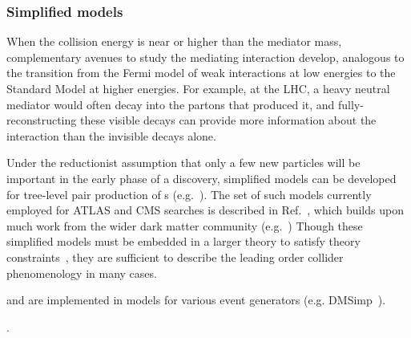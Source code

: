 \subsubsection{Simplified models}
\label{sub:simplifiedModels}

When the collision energy is near or higher than the mediator mass, complementary avenues to study the mediating interaction develop, analogous to the transition from the Fermi model of weak interactions at low energies to the Standard Model at higher energies.
For example, at the LHC, a heavy neutral \Zprime mediator would often decay into the partons that produced it, and fully-reconstructing these visible decays can provide more information about the interaction than the invisible decays alone. 

Under the reductionist assumption that only a few new particles will be important in the early phase of a discovery, simplified models can be developed for tree-level pair production of {\IP}s (e.g.~\cite{Alwall:2008ag, Alves:2011wf}). 
The set of such models currently employed for ATLAS and CMS searches is described in Ref.~\cite{Abercrombie:2015wmb}, which builds upon much work from the wider dark matter community (e.g.~\cite{Fox:2011pm,Abdallah:2015ter}) 
Though these simplified models must be embedded in a larger theory to satisfy theory constraints~\cite{Kahlhoefer:2015bea}, they are sufficient to describe the leading order collider phenomenology in many cases.

\begin{marginnote}[]
 and are implemented in models for various event generators (e.g. DMSimp~\cite{NewMadgraphModels}). 
\end{marginnote}. 



